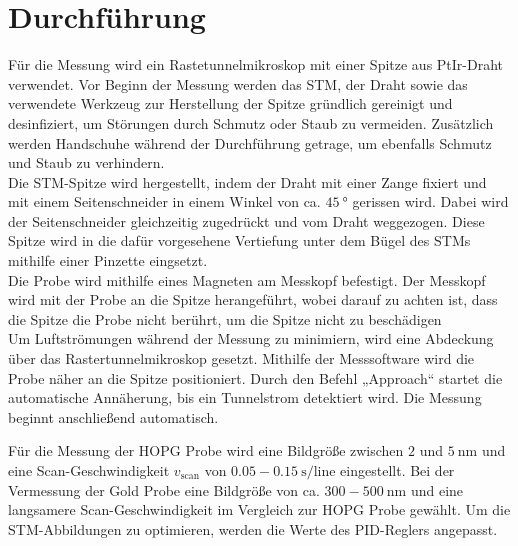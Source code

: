 \section{Durchführung}
\label{sec:Durchführung}
Für die Messung wird ein Rastetunnelmikroskop mit einer Spitze aus PtIr-Draht verwendet. 
Vor Beginn der Messung werden das STM, der Draht sowie das verwendete Werkzeug zur Herstellung der Spitze gründlich gereinigt und desinfiziert, um Störungen durch Schmutz oder Staub zu vermeiden. Zusätzlich werden Handschuhe während der Durchführung getrage, um ebenfalls Schmutz und Staub zu verhindern.\\

Die STM-Spitze wird hergestellt, indem der Draht mit einer Zange fixiert und mit einem Seitenschneider in einem Winkel von ca. $\SI{45}{\degree}$ gerissen wird. 
Dabei wird der Seitenschneider gleichzeitig zugedrückt und vom Draht weggezogen. 
Diese Spitze wird in die dafür vorgesehene Vertiefung unter dem Bügel des STMs mithilfe einer Pinzette eingsetzt. \\

Die Probe wird mithilfe eines Magneten am Messkopf befestigt. 
Der Messkopf wird mit der Probe an die Spitze herangeführt, wobei darauf zu achten ist, dass die Spitze die Probe nicht berührt, um die Spitze nicht zu beschädigen\\

Um Luftströmungen während der Messung zu minimiern, wird eine Abdeckung über das Rastertunnelmikroskop gesetzt. Mithilfe der Messsoftware wird die Probe näher an die Spitze positioniert. Durch den Befehl „Approach“ startet die automatische Annäherung, bis ein Tunnelstrom detektiert wird. Die Messung beginnt anschließend automatisch.

Für die Messung der HOPG Probe wird eine Bildgröße zwischen $2$ und $\SI{5}{\nano\meter}$ und eine Scan-Geschwindigkeit $v_{\text{scan}}$ von $\SI{0.05}-\SI{0.15}{\second\per\text{line}}$ eingestellt. Bei der Vermessung der Gold Probe eine Bildgröße von ca. $\SI{300}-\SI{500}{\nano\meter}$ und eine langsamere Scan-Geschwindigkeit im Vergleich zur HOPG Probe gewählt. Um die STM-Abbildungen zu optimieren, werden die Werte des PID-Reglers angepasst. 
